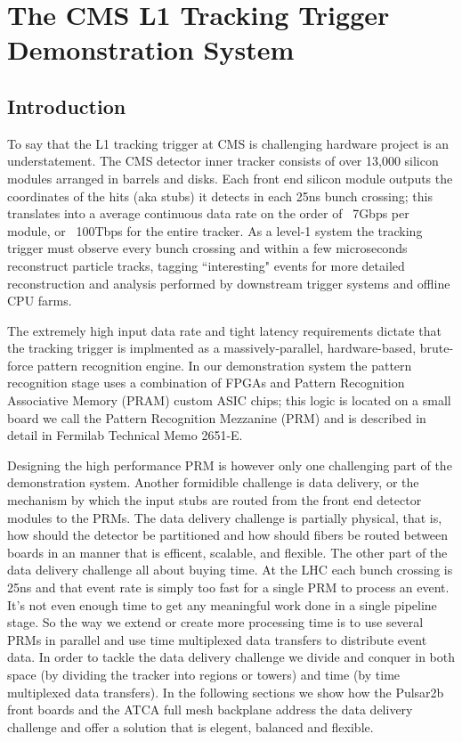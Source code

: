\documentclass[letterpaper]{article}
\begin{document}

\section{The CMS L1 Tracking Trigger Demonstration System}

\subsection{Introduction}

To say that the L1 tracking trigger at CMS is challenging hardware project is an understatement.  The CMS detector  inner tracker consists of over 13,000 silicon modules arranged in barrels and disks.  Each front end silicon module outputs the coordinates of the hits (aka stubs) it detects in each 25ns bunch crossing; this translates into a average continuous data rate on the order of ~7Gbps per module, or ~100Tbps for the entire tracker.  As a level-1 system the tracking trigger must observe every bunch crossing and within a few microseconds reconstruct particle tracks, tagging ``interesting" events for more detailed reconstruction and analysis performed by downstream trigger systems and offline CPU farms.  

The extremely high input data rate and tight latency requirements dictate that the tracking trigger is implmented as a massively-parallel, hardware-based, brute-force pattern recognition engine.  In our demonstration system the pattern recognition stage uses a combination of FPGAs and Pattern Recognition Associative Memory (PRAM)\cite{pram} custom ASIC chips; this logic is located on a small board we call the Pattern Recognition Mezzanine (PRM) and is described in detail in Fermilab Technical Memo 2651-E\cite{tm2651e}.  

Designing the high performance PRM is however only one challenging part of the demonstration system.  Another formidible challenge is data delivery, or the mechanism by which the input stubs are routed from the front end detector modules to the PRMs.  The data delivery challenge is partially physical, that is, how should the detector be partitioned and how should fibers be routed between boards in an manner that is efficent, scalable, and flexible.  The other part of the data delivery challenge all about buying time.  At the LHC each bunch crossing is 25ns and that event rate is simply too fast for a single PRM to process an event.  It's not even enough time to get any meaningful work done in a single pipeline stage.  So the way we extend or create more processing time is to use several PRMs in parallel and use time multiplexed data transfers to distribute event data.  In order to tackle the data delivery challenge we divide and conquer in both space (by dividing the tracker into regions or towers) and time (by time multiplexed data transfers).  In the following sections we show how the Pulsar2b front boards and the ATCA full mesh backplane address the data delivery challenge and offer a solution that is elegent, balanced and flexible.
\end{document}
